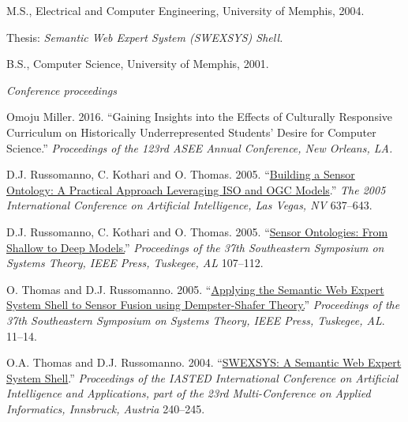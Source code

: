 \documentclass[11pt,article,oneside]{memoir}
\begin{document}
\ind M.S., Electrical and Computer Engineering, University of Memphis, 2004. 

\ind \hspace{0.35in} \footnotesize Thesis: \emph{Semantic Web Expert System (SWEXSYS) Shell.} \normalsize \vspace{0.01in}

\ind B.S., Computer Science, University of Memphis, 2001.
\bigskip 


\medskip

\noindent\emph{Conference proceedings \vspace{0.05in}}
 

\ind Omoju Miller. 2016. ``Gaining Insights into the Effects of Culturally Responsive Curriculum on Historically Underrepresented Students' Desire for Computer Science.'' \emph{Proceedings of the 123rd ASEE Annual Conference, New Orleans, LA.}

\ind D.J. Russomanno, C. Kothari and O. Thomas. 2005. ``\href{https://scholar.google.com/citations?view_op=view_citation&hl=en&user=E7z_wrwAAAAJ&sortby=pubdate&citation_for_view=E7z_wrwAAAAJ:u5HHmVD_uO8C}{Building a Sensor Ontology: A Practical Approach Leveraging ISO and OGC Models}.'' \emph{The 2005 International Conference on Artificial Intelligence, Las Vegas, NV} 637--643. 

\ind D.J. Russomanno, C. Kothari and O. Thomas. 2005. ``\href{http://scholar.google.com/citations?view_op=view_citation&hl=en&user=E7z_wrwAAAAJ&citation_for_view=E7z_wrwAAAAJ:u-x6o8ySG0sC}{Sensor Ontologies: From Shallow to Deep Models.}'' \emph{Proceedings of the 37th Southeastern Symposium on Systems Theory, IEEE Press, Tuskegee, AL} 107--112. 

\ind O. Thomas and D.J. Russomanno. 2005. ``\href{http://scholar.google.com/citations?view_op=view_citation&hl=en&user=E7z_wrwAAAAJ&citation_for_view=E7z_wrwAAAAJ:d1gkVwhDpl0C}{Applying the Semantic Web Expert System Shell to Sensor Fusion using Dempster-Shafer Theory.}'' \emph{Proceedings of the 37th Southeastern Symposium on Systems Theory, IEEE Press, Tuskegee, AL}. 11--14.

\ind O.A. Thomas and D.J. Russomanno. 2004. ``\href{http://scholar.google.com/citations?view_op=view_citation&hl=en&user=E7z_wrwAAAAJ&citation_for_view=E7z_wrwAAAAJ:2osOgNQ5qMEC}{SWEXSYS: A Semantic Web Expert System Shell}.'' \emph{Proceedings of the IASTED International Conference on Artificial Intelligence and Applications, part of the 23rd Multi-Conference on Applied Informatics, Innsbruck, Austria} 240--245. 
\end{document}

